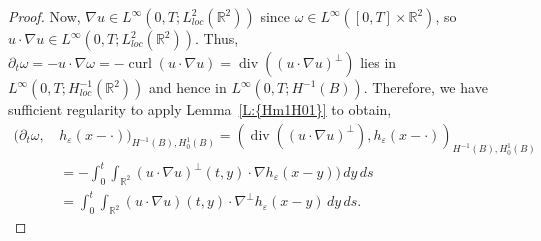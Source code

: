 \documentclass[reqno,openright,11pt,twoside]{amsart}
\theoremstyle{definition}
\numberwithin{equation}{section}
\begin{document}
\begin{proof}
	Now, ${\ensuremath{\nabla}} u \in L^{\ensuremath{\infty}}(0, T; L^2_{loc}({\ensuremath{{\ensuremath{\mathbb{{R}}}}}}^2))$ since $\omega \in L^{\ensuremath{\infty}}([0, T] \times {\ensuremath{{\ensuremath{\mathbb{{R}}}}}}^2)$,
	so $u \cdot {\ensuremath{\nabla}} u \in L^{\ensuremath{\infty}}(0, T; L^2_{loc}({\ensuremath{{\ensuremath{\mathbb{{R}}}}}}^2))$. Thus, ${\ensuremath{\partial}}_t \omega
	= -u \cdot {\ensuremath{\nabla}} \omega = -\operatorname{curl} (u \cdot {\ensuremath{\nabla}} u) = \operatorname{div}((u \cdot {\ensuremath{\nabla}} u)^\perp)$
	lies in $L^{\ensuremath{\infty}}(0, T; H_{loc}^{-1}({\ensuremath{{\ensuremath{\mathbb{{R}}}}}}^2))$ and hence in
	$L^{\ensuremath{\infty}}(0, T; H^{-1}(B))$.
	Therefore, we have sufficient regularity to apply {Lemma~\ref{L:{Hm1H01}}} to obtain,
	\begin{align*}
		({\ensuremath{\partial}}_t \omega, \, &h_{\ensuremath{\varepsilon}}(x - \cdot))_{H^{-1}(B), H_0^1(B)}
			= (\operatorname{div}((u \cdot {\ensuremath{\nabla}} u)^\perp), h_{\ensuremath{\varepsilon}}(x - \cdot))_{H^{-1}(B), H_0^1(B)} \\
			&= - \int_0^t \int_{{\ensuremath{{\ensuremath{\mathbb{{R}}}}}}^2} (u \cdot {\ensuremath{\nabla}} u)^\perp(t, y)
				\cdot {\ensuremath{\nabla}} h_{\ensuremath{\varepsilon}}(x - y)) \, dy \, ds \\
			&= \int_0^t \int_{{\ensuremath{{\ensuremath{\mathbb{{R}}}}}}^2} (u \cdot {\ensuremath{\nabla}} u)(t, y)
				\cdot {\ensuremath{\nabla}}^\perp h_{\ensuremath{\varepsilon}}(x - y) \, dy \, ds.
	\end{align*}
		

\end{proof}
\end{document}
